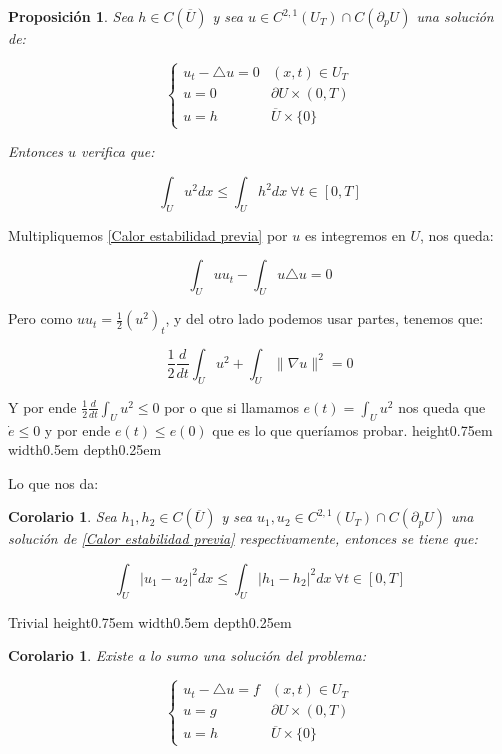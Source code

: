 \documentclass[11pt]{article}
\newtheorem{proposition}[theorem]{Proposici\'on}
\newtheorem{corollary}[theorem]{Corolario}
\newenvironment{proof}[1][Demostraci\'on]{\begin{trivlist}
\item[\hskip \labelsep {\bfseries #1}]}{\end{trivlist}}
\newcommand{\qed}{\nobreak \ifvmode \relax \else
      \ifdim\lastskip<1.5em \hskip-\lastskip
      \hskip1.5em plus0em minus0.5em \fi \nobreak
      \vrule height0.75em width0.5em depth0.25em\fi}
\begin{document}
\begin{proposition}

Sea $h \in C(\overline{U})$ y sea $u \in C^{2,1}(U_T) \cap C(\partial_pU)$ una soluci\'on de:

\begin{equation}
\label{Calor estabilidad previa}
{
	\left\{
		\begin{array}{lll}
			u_t -  \triangle u = 0 & (x,t) \in U_T \\
			u=0 & \partial U \times (0,T) \\
			u = h & \overline{U} \times \{0\}
		\end{array}
	\right.
}
\end{equation}

Entonces $u$ verifica que:

$$\int_{U}{u^2}dx \leq \int_{U}{h^2 dx} \ \forall t \in [0,T]$$

\end{proposition}

\begin{proof}

Multipliquemos \ref{Calor estabilidad previa} por $u$ es integremos en $U$, nos queda:

$$\int_{U}{uu_t} - \int_{U}{u \triangle u} = 0 $$

Pero como $uu_t = \frac{1}{2}(u^2)_t$, y del otro lado podemos usar partes, tenemos que:

$$\frac{1}{2} \frac{d}{dt} \int_{U}{u^2} + \int_{U}{\| \nabla u \|^2} = 0$$

Y por ende $\frac{1}{2} \frac{d}{dt} \int_{U}{u^2} \leq 0$ por o que si llamamos $e(t)= \int_{U}{u^2}$ nos queda que $\dot{e} \leq 0$ y por ende $e(t) \leq e(0)$ que es lo que quer\'iamos probar. \qed

\end{proof}

Lo que nos da:

\begin{corollary}

Sea $h_1,h_2 \in C(\overline{U})$ y sea $u_1,u_2 \in C^{2,1}(U_T) \cap C(\partial_pU)$ una soluci\'on de \ref{Calor estabilidad previa} respectivamente, entonces se tiene que:

$$\int_{U}{|u_1 - u_2|^2}dx \leq \int_{U}{|h_1 - h_2|^2 dx} \ \forall t \in [0,T]$$

\end{corollary}
\begin{proof}
Trivial \qed
\end{proof}
\begin{corollary}

Existe a lo sumo una soluci\'on del problema:

\begin{equation}
\label{Calor estabilidad }
{
	\left\{
		\begin{array}{lll}
			u_t -  \triangle u = f & (x,t) \in U_T \\
			u = g & \partial U \times (0,T) \\
			u = h & \overline{U} \times \{0\}
		\end{array}
	\right.
}
\end{equation}

\end{corollary}
\end{document}
